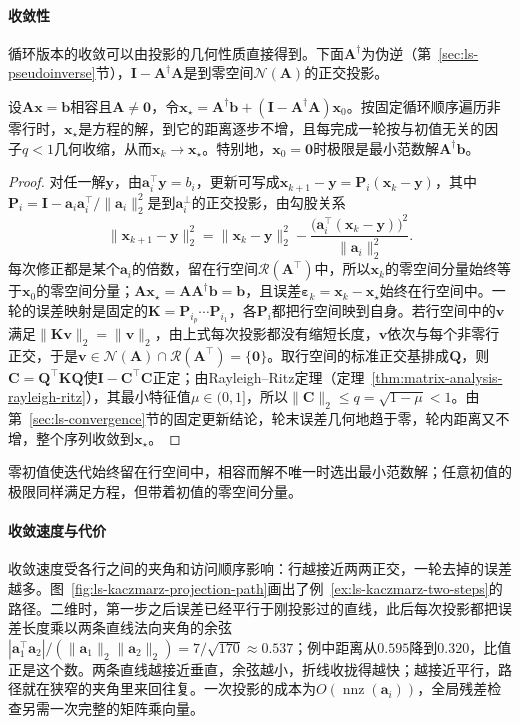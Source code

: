 \paragraph{收敛性}
循环版本的收敛可以由投影的几何性质直接得到。下面$\bm A^\dagger$为伪逆（第~\ref{sec:ls-pseudoinverse}节），$\bm I-\bm A^\dagger\bm A$是到零空间$\mathcal N(\bm A)$的正交投影。
\begin{theorem}[相容方程上循环Kaczmarz的收敛]
\label{thm:ls-kaczmarz-convergence}
设$\bm A\bm x=\bm b$相容且$\bm A\neq\bm 0$，令$\bm x_\star=\bm A^\dagger\bm b+(\bm I-\bm A^\dagger\bm A)\bm x_0$。按固定循环顺序遍历非零行时，$\bm x_\star$是方程的解，到它的距离逐步不增，且每完成一轮按与初值无关的因子$q<1$几何收缩，从而$\bm x_k\to\bm x_\star$。特别地，$\bm x_0=\bm 0$时极限是最小范数解$\bm A^\dagger\bm b$。
\end{theorem}
\begin{proof}
对任一解$\bm y$，由$\bm a_i^\top\bm y=b_i$，更新可写成$\bm x_{k+1}-\bm y=\bm P_i(\bm x_k-\bm y)$，其中$\bm P_i=\bm I-\bm a_i\bm a_i^\top/\lVert\bm a_i\rVert_2^2$是到$\bm a_i^\perp$的正交投影，由勾股关系
\[
\lVert\bm x_{k+1}-\bm y\rVert_2^2=\lVert\bm x_k-\bm y\rVert_2^2-\frac{\bigl(\bm a_i^\top(\bm x_k-\bm y)\bigr)^2}{\lVert\bm a_i\rVert_2^2}.
\]
每次修正都是某个$\bm a_i$的倍数，留在行空间$\mathcal R(\bm A^\top)$中，所以$\bm x_k$的零空间分量始终等于$\bm x_0$的零空间分量；$\bm A\bm x_\star=\bm A\bm A^\dagger\bm b=\bm b$，且误差$\bm\varepsilon_k=\bm x_k-\bm x_\star$始终在行空间中。一轮的误差映射是固定的$\bm K=\bm P_{i_p}\cdots\bm P_{i_1}$，各$\bm P_i$都把行空间映到自身。若行空间中的$\bm v$满足$\lVert\bm K\bm v\rVert_2=\lVert\bm v\rVert_2$，由上式每次投影都没有缩短长度，$\bm v$依次与每个非零行正交，于是$\bm v\in\mathcal N(\bm A)\cap\mathcal R(\bm A^\top)=\{\bm 0\}$。取行空间的标准正交基排成$\bm Q$，则$\bm C=\bm Q^\top\bm K\bm Q$使$\bm I-\bm C^\top\bm C$正定；由Rayleigh--Ritz定理（定理~\ref{thm:matrix-analysis-rayleigh-ritz}），其最小特征值$\mu\in(0,1]$，所以$\lVert\bm C\rVert_2\leq q=\sqrt{1-\mu}<1$。由第~\ref{sec:ls-convergence}节的固定更新结论，轮末误差几何地趋于零，轮内距离又不增，整个序列收敛到$\bm x_\star$。
\end{proof}
零初值使迭代始终留在行空间中，相容而解不唯一时选出最小范数解；任意初值的极限同样满足方程，但带着初值的零空间分量。

\paragraph{收敛速度与代价}
收敛速度受各行之间的夹角和访问顺序影响：行越接近两两正交，一轮去掉的误差越多。图~\ref{fig:ls-kaczmarz-projection-path}画出了例~\ref{ex:ls-kaczmarz-two-steps}的路径。二维时，第一步之后误差已经平行于刚投影过的直线，此后每次投影都把误差长度乘以两条直线法向夹角的余弦$|\bm a_1^\top\bm a_2|/(\lVert\bm a_1\rVert_2\lVert\bm a_2\rVert_2)=7/\sqrt{170}\approx0.537$；例中距离从$0.595$降到$0.320$，比值正是这个数。两条直线越接近垂直，余弦越小，折线收拢得越快；越接近平行，路径就在狭窄的夹角里来回往复。一次投影的成本为$O(\operatorname{nnz}(\bm a_i))$，全局残差检查另需一次完整的矩阵乘向量。

